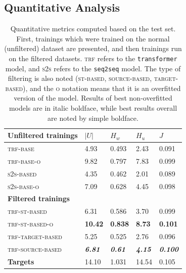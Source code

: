 \documentclass[11pt,a4paper]{article}
\begin{document}
\subsection{Quantitative Analysis}
\label{ssec:qa}

\begin{table}[t!]
	\small
	\begin{center}
		\begin{tabular}{lllll}
			
			\bf Unfiltered trainings & \(|U|\) & \(H_w\) & \(H_u\) & \(J\) \\ \hline
			
			\textsc{trf-base} & 4.93 & 0.493 & 2.43 & 0.091 \\
			\textsc{trf-base-o} & 9.82 & 0.797 & 7.83 & 0.099 \\
			\textsc{s2s-based} & 4.35 & 0.462 & 2.01 & 0.089 \\
			\textsc{s2s-base-o} & 7.09 & 0.628 & 4.45 & 0.098 \\ \hline
			\bf	Filtered trainings  &  &  &  &  \\ \hline
			
			\textsc{trf-st-based} & 6.31 & 0.586 & 3.70 & 0.099 \\
			\textsc{trf-st-based-o} & \bf10.42 & \bf0.838 & \bf8.73 & \bf0.101 \\
			\textsc{trf-target-based} & 5.25 & 0.525 & 2.76 & 0.096 \\
			\textsc{trf-source-based} & \textbf{\textit{6.81}} & \textbf{\textit{0.61}} & \textbf{\textit{4.15}} & \textbf{\textit{0.100}} \\ \hline
			
			\bf Targets & 14.10 & 1.031 & 14.54 & 0.105 \\ 
		\end{tabular}
	\end{center}
	\caption{\label{table:test_source} Quantitative metrics computed based on the test set. First, trainings which were trained on the normal (unfiltered) dataset are presented, and then trainings run on the filtered datasets. \textsc{trf} refers to the \texttt{transformer} model, and \textsc{s2s} refers to the \texttt{seq2seq} model. The type of filtering is also noted (\textsc{st-based}, \textsc{source-based}, \textsc{target-based}), and the \textsc{o} notation means that it is an overfitted version of the model. Results of best non-overfitted models are in italic boldface, while best results overall are noted by simple boldface.}
\end{table}
\end{document}
